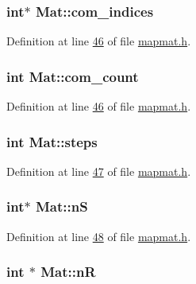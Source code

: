 \hypertarget{structMat_acd1137be3acc4749cd1226022b9bbe67}{
\subsubsection[{com\-\_\-indices}]{\setlength{\rightskip}{0pt plus 5cm}int$\ast$ Mat\-::com\-\_\-indices}}\label{structMat_acd1137be3acc4749cd1226022b9bbe67}


Definition at line \hyperlink{mapmat_8h_source_l00046}{46} of file \hyperlink{mapmat_8h_source}{mapmat.\-h}.

\hypertarget{structMat_ada2d04e4ec38ac2ce21099145b3b5e11}{
\subsubsection[{com\-\_\-count}]{\setlength{\rightskip}{0pt plus 5cm}int Mat\-::com\-\_\-count}}\label{structMat_ada2d04e4ec38ac2ce21099145b3b5e11}


Definition at line \hyperlink{mapmat_8h_source_l00046}{46} of file \hyperlink{mapmat_8h_source}{mapmat.\-h}.

\hypertarget{structMat_a1f42610fea23791bc58f95d445a63838}{
\subsubsection[{steps}]{\setlength{\rightskip}{0pt plus 5cm}int Mat\-::steps}}\label{structMat_a1f42610fea23791bc58f95d445a63838}


Definition at line \hyperlink{mapmat_8h_source_l00047}{47} of file \hyperlink{mapmat_8h_source}{mapmat.\-h}.

\hypertarget{structMat_a17303d0444340f5349c9d23628a15914}{
\subsubsection[{n\-S}]{\setlength{\rightskip}{0pt plus 5cm}int$\ast$ Mat\-::n\-S}}\label{structMat_a17303d0444340f5349c9d23628a15914}


Definition at line \hyperlink{mapmat_8h_source_l00048}{48} of file \hyperlink{mapmat_8h_source}{mapmat.\-h}.

\hypertarget{structMat_ab82b7beab655b5c6d0739a345d0566ed}{
\subsubsection[{n\-R}]{\setlength{\rightskip}{0pt plus 5cm}int $\ast$ Mat\-::n\-R}}\label{structMat_ab82b7beab655b5c6d0739a345d0566ed}


